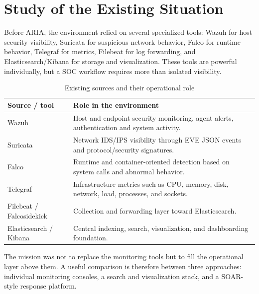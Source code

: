\section{Study of the Existing Situation}

Before ARIA, the environment relied on several specialized tools: Wazuh for host security visibility, Suricata for suspicious network behavior, Falco for runtime behavior, Telegraf for metrics, Filebeat for log forwarding, and Elasticsearch/Kibana for storage and visualization. These tools are powerful individually, but a SOC workflow requires more than isolated visibility.

\begin{table}[H]
\centering
\caption{Existing sources and their operational role}
\begin{tabularx}{\textwidth}{@{}p{}Y@{}}
\toprule
\textbf{Source / tool} & \textbf{Role in the environment} \\
\midrule
Wazuh & Host and endpoint security monitoring, agent alerts, authentication and system activity. \\
Suricata & Network IDS/IPS visibility through EVE JSON events and protocol/security signatures. \\
Falco & Runtime and container-oriented detection based on system calls and abnormal behavior. \\
Telegraf & Infrastructure metrics such as CPU, memory, disk, network, load, processes, and sockets. \\
Filebeat / Falcosidekick & Collection and forwarding layer toward Elasticsearch. \\
Elasticsearch / Kibana & Central indexing, search, visualization, and dashboarding foundation. \\
\bottomrule
\end{tabularx}
\end{table}


The mission was not to replace the monitoring tools but to fill the operational layer above them. A useful comparison is therefore between three approaches: individual monitoring consoles, a search and visualization stack, and a SOAR-style response platform.

